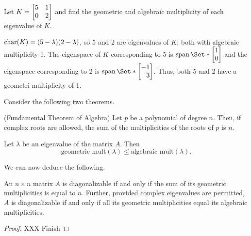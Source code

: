 \begin{example}
	Let $K=\mat{5&1\\0&2}$ and find the geometric and algebraic multiplicity of each eigenvalue of $K$.
	
	$\operatorname{char}(K)=(5-\lambda)(2-\lambda)$, so 5 and 2 are eigenvalues of $K$, both with algebraic multiplicity 1.
	The eigenspace of $K$ corresponding to 5 is $\Span\Set*{\mat{1\\0}}$ and the eigenspace
	corresponding to 2 is $\Span\Set*{\mat{-1\\3}}$. Thus, both 5 and 2 have a geometri 
	multiplicity of 1.
\end{example}


Consider the following two theorems.

\begin{theorem}(Fundamental Theorem of Algebra)
	Let $p$ be a polynomial of degree $n$. Then, if complex roots are allowed,
	the sum of the multiplicities of the roots of $p$ is $n$.
\end{theorem}

\begin{theorem}
	Let $\lambda$ be an eigenvalue of the matrix $A$. Then
	\[
		\text{geometric mult}(\lambda)\leq \text{algebraic mult}(\lambda).
	\]
\end{theorem}

We can now deduce the following.
\begin{theorem}
	An $n\times n$ matrix $A$ is diagonalizable if and only if the sum of its geometric multiplicities
	is equal to $n$. Further, provided complex eigenvalues are permitted, $A$ is diagonalizable if and
	only if all its geometric multiplicities equal its algebraic multiplicities.
\end{theorem}
\begin{proof}
	XXX Finish
\end{proof}
